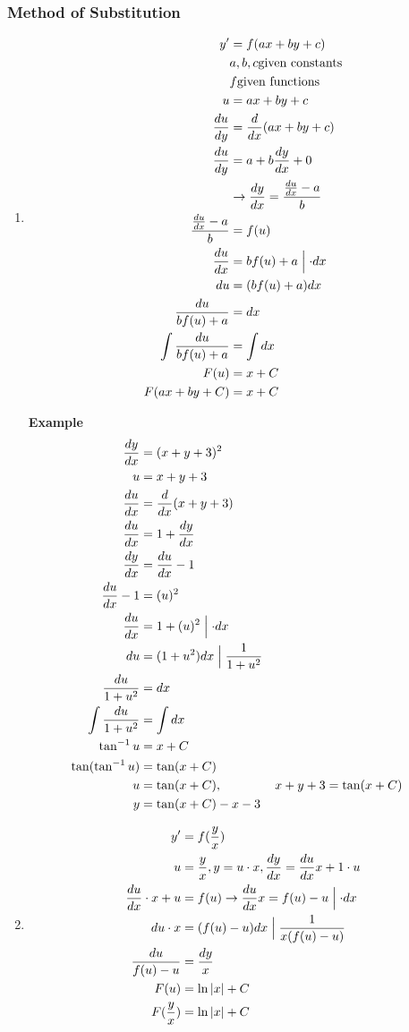 \documentclass[10pt, letterpaper]{article}
\begin{document}
\subsubsection{Method of Substitution}
\begin{enumerate}
	\item
\begin{align*}
y' &= f(ax + by + c)\\
&a, b, c \text{given constants}\\
&f \text{given functions}\\
u &= ax + by + c\\
\frac{du}{dy} &= \frac{d}{dx}(ax+by+c)\\
\frac{du}{dy} &= a +b\frac{dy}{dx} + 0\\
&\rightarrow \frac{dy}{dx} = \frac{\frac{du}{dx}-a}{b}\\
\frac{\frac{du}{dx}-a}{b} &= f(u)\\
\frac{du}{dx} &= bf(u)+a \Bigm \lvert \cdot dx\\
du &= (bf(u) + a)dx\\
\frac{du}{bf(u) + a} &= dx\\
\int \limits \frac{du}{bf(u) + a} &= \int \limits dx\\
F(u) &= x+C\\
F(ax+by+C) &= x + C
\end{align*}

\textbf{Example}
\begin{align*}
\frac{dy}{dx} &= (x+y+3)^2\\
u &= x+y+3\\
\frac{du}{dx} &= \frac{d}{dx}(x+y+3)\\
\frac{du}{dx} &= 1 + \frac{dy}{dx}\\
\frac{dy}{dx} &= \frac{du}{dx} - 1\\
\frac{du}{dx} - 1 &= (u)^2\\
\frac{du}{dx} &= 1 + (u)^2 \Bigm \lvert \cdot dx\\
du &= (1+u^2)dx \Bigm \lvert \frac{1}{1+u^2}\\
\frac{du}{1+u^2} &= dx\\
\int \limits \frac{du}{1+u^2} &= \int \limits dx\\
\tan^{-1} u &= x+C\\
\tan(\tan^{-1} u) &= \tan(x+C)\\
u &= \tan(x+C),& x+y+3 &= \tan(x+C)\\
y &= \tan(x+C)-x-3
\end{align*}

\item
\begin{align*}
y' &= f(\frac{y}{x})\\
u &= \frac{y}{x}, y = u \cdot x, \frac{dy}{dx} = \frac{du}{dx} x + 1 \cdot u\\
\frac{du}{dx} \cdot x + u &= f(u) \rightarrow \frac{du}{dx} x = f(u)-u \Bigm \lvert \cdot dx\\
du \cdot x &= (f(u)-u)dx \Bigm \lvert \frac{1}{x(f(u)-u)}\\
\frac{du}{f(u)-u} &= \frac{dy}{x}\\
F(u) &= \ln|x|+C\\
F(\frac{y}{x}) &= \ln|x|+C
\end{align*}


\end{enumerate}
\end{document}
